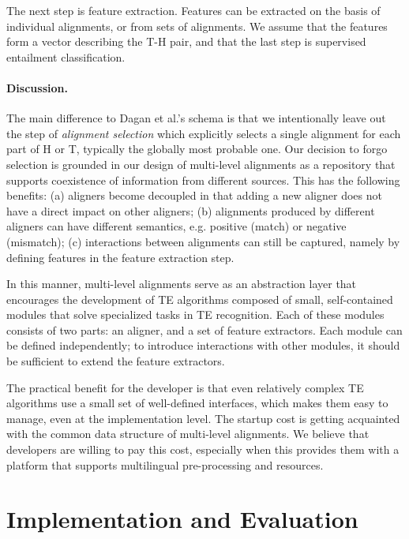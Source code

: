 \documentclass[11pt,a4paper]{article}
\begin{document}
The next step is feature extraction. Features can be extracted on the
basis of individual alignments, or from sets of alignments. We assume
that the features form a vector describing the T-H pair, and that the
last step is supervised entailment classification.

\paragraph{Discussion.} The main difference to Dagan et al.'s schema
is that we intentionally leave out the step of {\em alignment
  selection} which explicitly selects a single alignment for each part
of H or T, typically the globally most probable one.  Our decision to
forgo selection is grounded in our design of multi-level alignments as
a repository that supports coexistence of information from different
sources. This has the following benefits: (a) aligners become
decoupled in that adding a new aligner does not have a direct impact
on other aligners;
(b) alignments produced by different aligners can have different
semantics, e.g. positive (match) or negative (mismatch); (c)
interactions between alignments can still be captured, namely by
defining features in the feature extraction step.

In this manner, multi-level alignments serve as an abstraction layer
that encourages the development of TE algorithms composed of small,
self-contained modules that solve specialized tasks in TE
recognition. Each of these modules consists of two parts: an aligner,
and a set of feature extractors. Each module can be defined
independently; to introduce interactions with other modules, it should
be sufficient to extend the feature extractors.

The practical benefit for the developer is that even relatively
complex TE algorithms use a small set of well-defined interfaces,
which makes them easy to manage, even at the implementation level. The
startup cost is getting acquainted with the common data structure of
multi-level alignments. We believe that developers are willing to pay
this cost, especially when this provides them with a platform that
supports multilingual pre-processing and resources. 

\section{Implementation and Evaluation}
\label{sec:impl}
\end{document}
